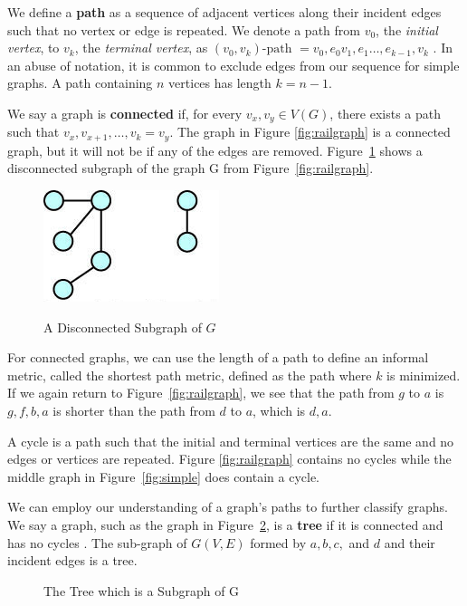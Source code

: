 We define a \textbf{path} as a sequence of adjacent vertices along their incident edges such that no vertex or edge is repeated. We denote a path from $v_0$, the \textit{initial vertex}, to $v_k$, the \textit{terminal vertex}, as $(v_0,v_k)\text{-path }=v_0,e_0v_1,e_1\dots,e_{k-1},v_k$ \cite{ed}. In an abuse of notation, it is common to exclude edges from our sequence for simple graphs. A path containing $n$ vertices has length $k=n-1$.


We say a graph is \textbf{connected} if, for every $v_x,v_y \in V(G)$, there exists a path such that $v_x,v_{x+1},\dots, v_{k}=v_y$\cite{ed}. The graph in Figure \ref{fig:railgraph} is a connected graph, but it will not be if any of the edges are removed. Figure~\ref{fig:connected} shows a disconnected subgraph of the graph G from Figure~\ref{fig:railgraph}.

\begin{figure}[h]
\centering
\caption{A Disconnected Subgraph of $G$}
\includegraphics[scale=.5]{connected.jpg}
\label{fig:connected}
\end{figure}

For connected graphs, we can use the length of a path to define an informal metric, called the shortest path metric, defined as the path where $k$ is minimized. If we again return to Figure~\ref{fig:railgraph}, we see that the path from $g$ to $a$ is $g,f,b,a$ is shorter than the path from $d$ to $a$, which is $d, a$.

A cycle is a path such that the initial and terminal vertices are the same and no edges or vertices are repeated. Figure \ref{fig:railgraph} contains no cycles while the middle graph in Figure~\ref{fig:simple} does contain a cycle.



We can employ our understanding of a graph's paths to further classify graphs. We say a graph, such as the graph in Figure~\ref{fig:tree}, is a \textbf{tree} if it is connected and has no cycles \cite{ed}. The sub-graph of $G(V,E)$ formed by $a,b,c,$ and $d$ and their incident edges is a tree.

\begin{figure}[h]
\caption{The Tree which is a Subgraph of G}\label{fig:tree}
\centering
{}
\end{figure}


